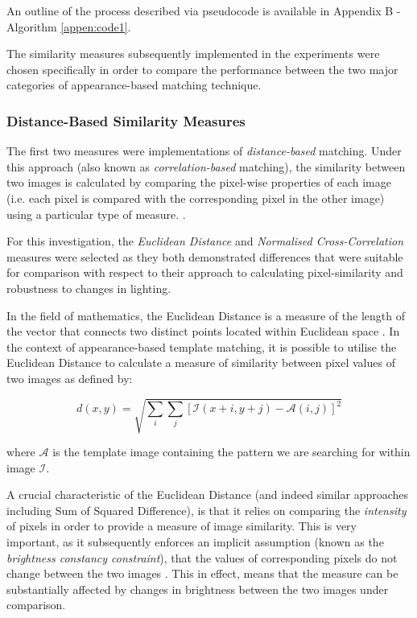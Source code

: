 An outline of the process described via pseudocode is available in Appendix B - Algorithm \ref{appen:code1}.

The similarity measures subsequently implemented in the experiments were chosen specifically in order to compare the performance between the two major categories of appearance-based matching technique. 

\subsubsection{Distance-Based Similarity Measures}

The first two measures were implementations of \textit{distance-based} matching. Under this approach (also known as \textit{correlation-based} matching), the similarity between two images is calculated by comparing the pixel-wise properties of each image (i.e. each pixel is compared with the corresponding pixel in the other image) using a particular type of measure. \cite{szeliski}. 

For this investigation, the \textit{Euclidean Distance} and \textit{Normalised Cross-Correlation} measures were selected as they both demonstrated differences that were suitable for comparison with respect to their approach to calculating pixel-similarity and robustness to changes in lighting. 

In the field of mathematics, the Euclidean Distance is a measure of the length of the vector that connects two distinct points located within Euclidean space \cite{szeliski}. In the context of appearance-based template matching, it is possible to utilise the Euclidean Distance to calculate a measure of similarity between pixel values of two images as defined by:

\begin{equation}
d(x, y) = \sqrt{\sum\limits_{i}\sum\limits_{j}[\mathcal{I}(x + i, y + j) - \mathcal{A}(i, j)]^2}
\end{equation}

where $\mathcal{A}$ is the template image containing the pattern we are searching for within image $\mathcal{I}$. 

A crucial characteristic of the Euclidean Distance (and indeed similar approaches including Sum of Squared Difference), is that it relies on comparing the \textit{intensity} of pixels in order to provide a measure of image similarity. This is very important, as it subsequently enforces an implicit assumption (known as the \textit{brightness constancy constraint}), that the values of corresponding pixels do not change between the two images \cite{szeliski}. This in effect, means that the measure can be substantially affected by changes in brightness between the two images under comparison.  

